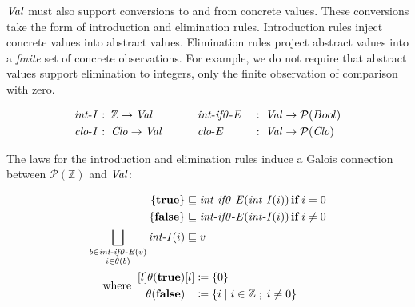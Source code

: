 \par

$ \operatorname{\mathit{Val}} $ must also support conversions to and from concrete
values. These conversions take the form of introduction and elimination
rules. Introduction rules inject concrete values into abstract values.
Elimination rules project abstract values into a \emph{finite} set of
concrete observations. For example, we do not require that abstract
values support elimination to integers, only the finite observation of
comparison with zero.

\small\begin{alignat*}{4}
 \operatorname{\mathit{int-I}}  &  \mathbin{\colon}   \mathbb{Z}   \rightarrow   \operatorname{\mathit{Val}}  &&  \hspace{1em}   \hspace{1em} \operatorname{\mathit{int-if0-E}}  &&  \mathbin{\colon}   \operatorname{\mathit{Val}}   \rightarrow   \mathcal{P} (Bool) \\
 \operatorname{\mathit{clo-I}}  &  \mathbin{\colon}   \operatorname{\mathit{Clo}}   \rightarrow   \operatorname{\mathit{Val}}  &&  \hspace{1em}   \hspace{1em} \operatorname{\mathit{clo-E}}  &&  \mathbin{\colon}   \operatorname{\mathit{Val}}   \rightarrow   \mathcal{P}  (\operatorname{\mathit{Clo}}) 
\end{alignat*}\normalsize

\par

The laws for the introduction and elimination rules induce a Galois
connection between $ \mathcal{P} ( \mathbb{Z} )$ and $ \operatorname{\mathit{Val}} $:

\small\begin{alignat*}{2}
 \{  \ttbfop{true}  \}  &  \sqsubseteq   \itop{int-if0-E}  (\itop{int-I}( i))  \ttbfop{if}  i = 0 \\
 \{  \ttbfop{false}  \}  &  \sqsubseteq   \itop{int-if0-E}  (\itop{int-I}( i))  \ttbfop{if}  i  \neq  0 \\
 \bigsqcup  _{\substack{ b  \in   \itop{int-if0-E}( v)  \\  i  \in   \theta (b) }}   \itop{int-I}( i) &  \sqsubseteq  v \\
 \;\;\text{where}\;\;   \begin{aligned}[l]   \theta  (\ttbfop{true})   \\   \theta  (\ttbfop{false})   \end{aligned}  &  \begin{aligned}[l]  &  \coloneqq   \{ 0 \}   \\  &  \coloneqq   \{ i  \;|\;  i  \in   \mathbb{Z}   \;;\;  i  \neq  0 \}   \end{aligned} 
\end{alignat*}\normalsize

